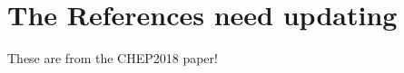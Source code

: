 \documentclass{webofc}
\begin{document}
%
%
%
%
% 
%
%
%
%

\section {The References need updating} 
These are from the CHEP2018 paper!


\end{document}
